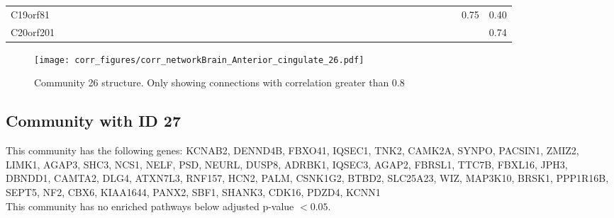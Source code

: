 \begin{longtable}{lrrrrrrrrrrrrrrrrrrrrrrrrrrrrrrrrrrrrrrrrrr}
C19orf81      &            &           &               &               &            &             &             &              &               &            &               &             &               &             &               &              &             &              &             &             &             &             &                &                &               &               &                     &              &             &                &            &              &               &            &              &            &               &            &              &                &            0.75 &          0.40 \\
C20orf201     &            &           &               &               &            &             &             &              &               &            &               &             &               &             &               &              &             &              &             &             &             &             &                &                &               &               &                     &              &             &                &            &              &               &            &              &            &               &            &              &                &                 &          0.74 \\
\end{longtable}


\begin{figure}[h!]
\centering
\texttt{[image: corr\_figures/corr\_networkBrain\_Anterior\_cingulate\_26.pdf]}
\caption{Community 26 structure. Only showing connections with correlation greater than 0.8}
\end{figure}




\subsection*{Community with ID 27}
This community has the following genes: KCNAB2, DENND4B, FBXO41, IQSEC1, TNK2, CAMK2A, SYNPO, PACSIN1, ZMIZ2, LIMK1, AGAP3, SHC3, NCS1, NELF, PSD, NEURL, DUSP8, ADRBK1, IQSEC3, AGAP2, FBRSL1, TTC7B, FBXL16, JPH3, DBNDD1, CAMTA2, DLG4, ATXN7L3, RNF157, HCN2, PALM, CSNK1G2, BTBD2, SLC25A23, WIZ, MAP3K10, BRSK1, PPP1R16B, SEPT5, NF2, CBX6, KIAA1644, PANX2, SBF1, SHANK3, CDK16, PDZD4, KCNN1
\\
This community has no enriched pathways below adjusted p-value $< 0.05$.

